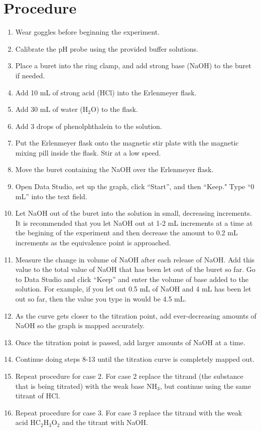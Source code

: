 \documentclass[10pt, letterpaper]{article}
\begin{document}
\section{Procedure}
\begin{enumerate}
\item {Wear goggles before beginning the experiment.}
\item{Calibrate the pH probe using the provided buffer solutions.}
\item{Place a buret into the ring clamp, and add strong base (NaOH) to the buret if needed.}
\item{Add 10 mL of strong acid (HCl) into the Erlenmeyer flask.}
\item{Add 30 mL of water (H$_{2}$O) to the flask.}
\item{Add 3 drops of phenolphthalein to the solution.}
\item{Put the Erlenmeyer flask onto the magnetic stir plate with the magnetic mixing pill inside the flask. Stir at a low speed.}
\item{Move the buret containing the NaOH over the Erlenmeyer flask.}
\item{Open Data Studio, set up the graph, click “Start”, and then “Keep." Type “0 mL” into the text field.}
\item{Let NaOH out of the buret into the solution in small, decreasing increments. It is recommended that you let NaOH out at 1-2 mL increments at a time at the begining of the experiment and then decrease the amount to 0.2 mL increments as the equivalence point is approached.}
\item{Measure the change in volume of NaOH after each release of NaOH. Add this value to the total value of NaOH that has been let out of the buret so far. Go to Data Studio and click “Keep” and enter the volume of base added to the solution. For example, if you let out 0.5 mL of NaOH and 4 mL has been let out so far, then the value you type in would be 4.5 mL.}
\item{As the curve gets closer to the titration point, add ever-decreasing amounts of NaOH so the graph is mapped accurately.}
\item{Once the titration point is passed, add larger amounts of NaOH at a time.}
\item{Continue doing steps 8-13 until the titration curve is completely mapped out.}
\item{Repeat procedure for case 2. For case 2 replace the titrand (the substance that is being titrated) with the weak base NH$_{3}$, but continue using the same titrant of HCl.}
\item{Repeat procedure for case 3. For case 3 replace the titrand with the weak acid HC$_{2}$H$_{3}$O$_{2}$ and the titrant with NaOH.}
\end{enumerate}
\end{document}
